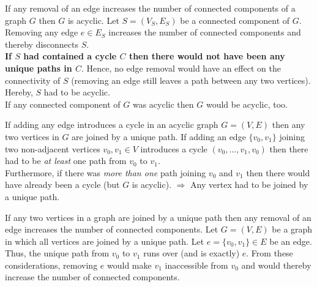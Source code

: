 \documentclass[a4paper]{article}
\begin{document}
	\begin{solution}{2}
		\begin{theorem}{If any removal of an edge increases the number of connected components of a graph $G$ then $G$ is acyclic.}
			Let $S = (V_S, E_S)$ be a connected component of $G$. Removing any edge $e \in E_S$ increases the number of connected components and thereby disconnects $S$.\\
			\textbf{If $S$ had contained a cycle $C$ then there would not have been any unique paths in $C$}. Hence, no edge removal would have an effect on the connectivity of $S$ (removing an edge still leaves a path between any two vertices). Hereby, $S$ had to be acyclic.\\
			 If any connected component of $G$ was acyclic then $G$ would be acyclic, too.
		\end{theorem}
		\begin{theorem}{If adding any edge introduces a cycle in an acyclic graph $G = (V, E)$ then any two vertices in $G$ are joined by a unique path.}
			If adding an edge $\{v_0, v_1\}$ joining two non-adjacent vertices $v_0, v_1 \in V$ introduces a cycle $(v_0, ..., v_1, v_0)$ then there had to be \emph{at least} one path from $v_0$ to $v_1$.\\
			Furthermore, if there was \emph{more than one} path joining $v_0$ and $v_1$ then there would have already been a cycle (but $G$ is acyclic). $\Rightarrow$ Any vertex had to be joined by a unique path.
		\end{theorem}
		\begin{theorem}{If any two vertices in a graph are joined by a unique path then any removal of an edge increases the number of connected components.}
			Let $G = (V, E)$ be a graph in which all vertices are joined by a unique path. Let $e = \{v_0, v_1\} \in E$ be an edge. Thus, the unique path from $v_0$ to $v_1$ runs over (and is exactly) $e$. From these considerations, removing $e$ would make $v_1$ inaccessible from $v_0$ and would thereby increase the number of connected components.
		\end{theorem}
	\end{solution} 
	\newpage
\end{document}
